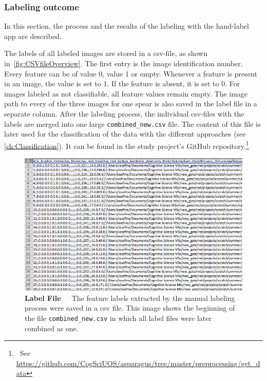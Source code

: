 \subsubsection{Labeling outcome}
\label{subsec:SortingOutcome}

In this section, the process and the results of the labeling with the hand-label app are described.

The labels of all labeled images are stored in a csv-file, as shown in~\autoref{fig:CSVfileOverview}. The first entry is the image identification number. Every feature can be of value 0, value 1 or empty. Whenever a feature is present in an image, the value is set to 1. If the feature is absent, it is set to 0. For images labeled as not classifiable, all feature values remain empty. The image path to every of the three images for one spear is also saved in the label file in a separate column. After the labeling process, the individual csv-files with the labels are merged into one large \texttt{combined\_new.csv} file. The content of this file is later used for the classification of the data with the different approaches (see \autoref{ch:Classification}). It can be found in the study project’s GitHub repository.\footnote{~See \url{https://github.com/CogSciUOS/asparagus/tree/master/preprocessing/get_data}}

\begin{figure}[!ht]
	\centering
	\includegraphics[scale=0.5]{Figures/chapter03/csv_overview.png}
	\decoRule
	\caption[Manual Labeling Output CSV-File]{\textbf{Label File}~~~The feature labels extracted by the manual labeling process were saved in a csv file. This image shows the beginning of the file \texttt{combined\_new.csv} in which all label files were later combined as one.}
	\label{fig:CSVfileOverview}
\end{figure}

